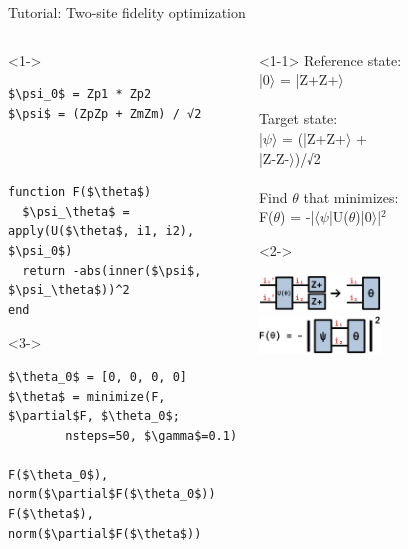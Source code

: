 \begin{frame}[fragile]{Tutorial: Two-site fidelity optimization}

\begin{columns}

\begin{column}{5cm}

\begin{onlyenv}<1->
\begin{lstlisting}[language=JuliaLocal, style=julia, mathescape, basicstyle=\small]
$\psi_0$ = Zp1 * Zp2
$\psi$ = (ZpZp + ZmZm) / √2



function F($\theta$)
  $\psi_\theta$ = apply(U($\theta$, i1, i2), $\psi_0$)
  return -abs(inner($\psi$, $\psi_\theta$))^2
end
\end{lstlisting}
\end{onlyenv}

\begin{onlyenv}<3->
\begin{lstlisting}[language=JuliaLocal, style=julia, mathescape, basicstyle=\small]
$\theta_0$ = [0, 0, 0, 0]
$\theta$ = minimize(F, $\partial$F, $\theta_0$;
        nsteps=50, $\gamma$=0.1)

F($\theta_0$), norm($\partial$F($\theta_0$))
F($\theta$), norm($\partial$F($\theta$))
 \end{lstlisting}

\end{onlyenv}
\end{column}

\begin{column}{5cm}

\begin{onlyenv}<1-1>
Reference state: \\
|0$\rangle$ = |Z+Z+$\rangle$ \\
~\\
Target state: \\
|$\psi\rangle$ = (|Z+Z+$\rangle$ + \\
          |Z-Z-$\rangle$)/√2 \\
~\\
Find $\theta$ that minimizes: \\
F($\theta$) = -|$\langle\psi$|U($\theta$)|0$\rangle$|$^2$
\end{onlyenv}

\begin{onlyenv}<2->
\vspace*{0.0cm}
\begin{center}
\includegraphics[width=0.2\textwidth]{
  slides/assets/UZp1Zp2.png
} \\
\includegraphics[width=0.2\textwidth]{
  slides/assets/psi12theta12.png
}
\end{center}
\vspace*{0.0cm}
\end{onlyenv}


\end{column}
\end{columns}
\end{frame}

